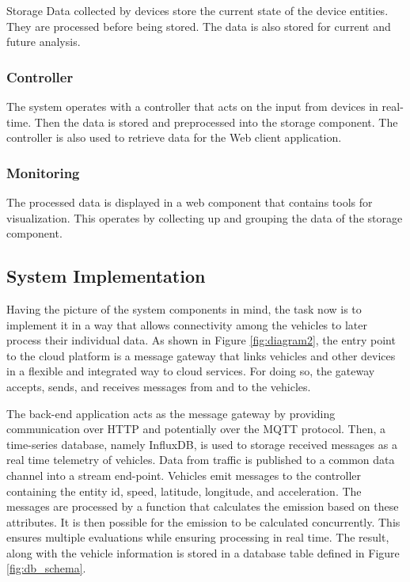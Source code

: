 \documentclass[letter, 10pt, conference]{ieeeconf}
\begin{document}
Storage Data collected by devices store the current state of the device entities.
They are processed before being stored.
The data is also stored for current and future analysis.

\subsubsection{Controller}

The system operates with a controller that acts on the input from devices in real-time.
Then the data is stored and preprocessed into the storage component.
The controller is also used to retrieve data for the Web client application.

\subsubsection{Monitoring}

The processed data is displayed in a web component that contains tools for visualization.
This operates by collecting up and grouping the data of the storage component.

\subsection{System Implementation}

Having the picture of the system components in mind, the task now is to implement it in a way that allows connectivity among the vehicles to later process their individual data.
As shown in Figure \ref{fig:diagram2}, the entry point to the cloud platform is a message gateway that links vehicles and other devices in a flexible and integrated way to cloud services.
For doing so, the gateway accepts, sends, and receives messages from and to the vehicles.

The back-end application acts as the message gateway by providing communication over HTTP and potentially over the MQTT protocol.
Then, a time-series database, namely InfluxDB, is used to storage received messages as a real time telemetry of vehicles.
Data from traffic is published to a common data channel into a stream end-point.
Vehicles emit messages to the controller containing the entity id, speed, latitude, longitude, and acceleration.
The messages are processed by a function that calculates the emission based on these attributes.
It is then possible for the emission to be calculated concurrently.
This ensures multiple evaluations while ensuring processing in real time.
The result, along with the vehicle information is stored in a database table defined in Figure \ref{fig:db_schema}.
\end{document}
